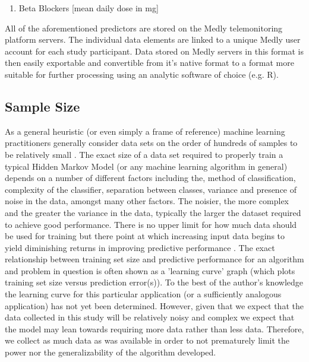 \documentclass[]{article}
\begin{document}
\begin{enumerate}
\begin{enumerate}
		\item Beta Blockers [mean daily dose in mg]  %
	\end{enumerate} 
\end{enumerate}

All of the aforementioned predictors are stored on the Medly telemonitoring platform servers. The individual data elements are linked to a unique Medly user account for each study participant. Data stored on Medly servers in this format is then easily exportable and convertible from it's native format to a format more suitable for further processing using an analytic software of choice (e.g. R).  

\subsection{Sample Size} %

As a general heuristic (or even simply a frame of reference) machine learning practitioners generally consider data sets on the order of hundreds of samples to be relatively small \cite{Acta2013,Figueroa2012,Brownlee2017}. The exact size of a data set required to properly train a typical Hidden Markov Model (or any machine learning algorithm in general) depends on a number of different factors including the, method of classification, complexity of the classifier, separation between classes, variance and presence of noise in the data, amongst many other factors. The noisier, the more complex and the greater the variance in the data, typically the larger the dataset required to achieve good performance. There is no upper limit for how much data should be used for training but there point at which increasing input data begins to yield diminishing returns in improving predictive performance \cite{Brownlee2017}. The exact relationship between training set size and predictive performance for an algorithm and problem in question is often shown as a 'learning curve' graph (which plots training set size versus prediction error(s)). To the best of the author's knowledge the learning curve for this particular application (or a sufficiently analogous application) has not yet been determined. However, given that we expect that the data collected in this study will be relatively noisy and complex we expect that the model may lean towards requiring more data rather than less data. Therefore, we collect as much data as was available in order to not prematurely limit the power nor the generalizability of the algorithm developed.
\end{document}
